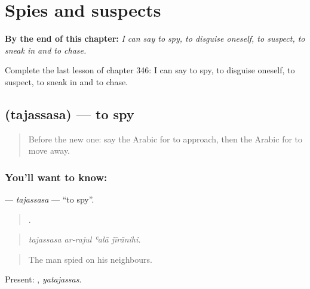 
\chapter{Spies and suspects}
\label{ch:ar-spies-and-suspects}

\begin{chapteropening}
\textbf{By the end of this chapter:} \emph{I can say to spy, to disguise oneself, to suspect, to sneak in and to chase.}

Complete the last lesson of chapter 346: I can say to spy, to disguise oneself, to suspect, to sneak in and to chase.
\end{chapteropening}

\section[\texorpdfstring{\ar{تجسس} (tajassasa)}{تجسس (tajassasa)}]{ (tajassasa) — to spy}

\label{lesson:AR-C346-tajassasa}



\begin{quote}
Before the new one: say the Arabic for to approach, then the Arabic for to move away.
\end{quote}

\subsection*{You'll want to know: }
\textbf{} — \emph{tajassasa} — \textquotedblleft{}to spy\textquotedblright{}.

\begin{quote}
   .
\end{quote}

\begin{quote}
\emph{tajassasa ar-rajul ʿalā jīrānihi.}
\end{quote}

\begin{quote}
The man spied on his neighbours.
\end{quote}

Present: , \emph{yatajassas}.

